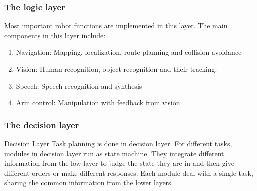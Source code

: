 \subsubsection{The logic layer}
Most important robot functions are implemented in this layer. The main components in this layer include:
\begin{enumerate}
    \item Navigation: Mapping, localization, route-planning and collision avoidance
    \item Vision: Human recognition, object recognition and their tracking.
    \item Speech: Speech recognition and synthesis
    \item Arm control: Manipulation with feedback from vision
\end{enumerate}

\subsubsection{The decision layer}
Decision Layer Task planning is done in decision layer. For different tasks, modules in decision layer run as state machine. They integrate different information from the low layer to judge the state they are in and then give different orders or make different responses. Each module deal with a single task, sharing the common information from the lower layers.

